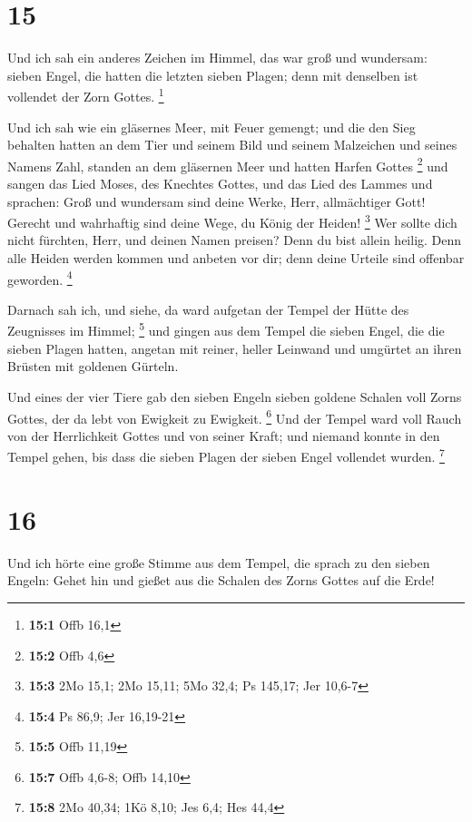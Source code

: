 \hypertarget{section-4}{%
\section{15}\label{section-4}}

 Und ich sah ein anderes Zeichen im Himmel, das war groß
und wundersam: sieben Engel, die hatten die letzten sieben Plagen; denn
mit denselben ist vollendet der Zorn Gottes. \footnote{\textbf{15:1}
  Offb 16,1}

 Und ich sah wie ein gläsernes Meer, mit Feuer gemengt;
und die den Sieg behalten hatten an dem Tier und seinem Bild und seinem
Malzeichen und seines Namens Zahl, standen an dem gläsernen Meer und
hatten Harfen Gottes \footnote{\textbf{15:2} Offb 4,6} 
und sangen das Lied Moses, des Knechtes Gottes, und das Lied des Lammes
und sprachen: Groß und wundersam sind deine Werke, Herr, allmächtiger
Gott! Gerecht und wahrhaftig sind deine Wege, du König der Heiden!
\footnote{\textbf{15:3} 2Mo 15,1; 2Mo 15,11; 5Mo 32,4; Ps 145,17; Jer
  10,6-7}  Wer sollte dich nicht fürchten, Herr, und
deinen Namen preisen? Denn du bist allein heilig. Denn alle Heiden
werden kommen und anbeten vor dir; denn deine Urteile sind offenbar
geworden. \footnote{\textbf{15:4} Ps 86,9; Jer 16,19-21}

 Darnach sah ich, und siehe, da ward aufgetan der Tempel
der Hütte des Zeugnisses im Himmel; \footnote{\textbf{15:5} Offb 11,19}
 und gingen aus dem Tempel die sieben Engel, die die
sieben Plagen hatten, angetan mit reiner, heller Leinwand und umgürtet
an ihren Brüsten mit goldenen Gürteln.

 Und eines der vier Tiere gab den sieben Engeln sieben
goldene Schalen voll Zorns Gottes, der da lebt von Ewigkeit zu Ewigkeit.
\footnote{\textbf{15:7} Offb 4,6-8; Offb 14,10}  Und der
Tempel ward voll Rauch von der Herrlichkeit Gottes und von seiner Kraft;
und niemand konnte in den Tempel gehen, bis dass die sieben Plagen der
sieben Engel vollendet wurden. \footnote{\textbf{15:8} 2Mo 40,34; 1Kö
  8,10; Jes 6,4; Hes 44,4}

\hypertarget{section-5}{%
\section{16}\label{section-5}}

 Und ich hörte eine große Stimme aus dem Tempel, die
sprach zu den sieben Engeln: Gehet hin und gießet aus die Schalen des
Zorns Gottes auf die Erde!

